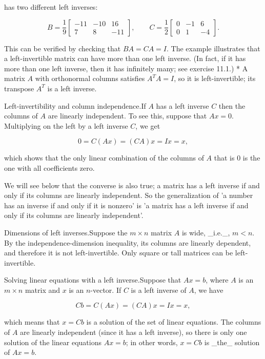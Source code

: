 has two different left inverses:

\[B=\frac{1}{9}\left[\begin{array}{rrr}-11&-10&16\\ 7&8&-11\end{array}\right],\qquad C=\frac{1}{2}\left[\begin{array}{rrr}0&-1&6\\ 0&1&-4\end{array}\right].\]

This can be verified by checking that \(BA=CA=I\). The example illustrates that a left-invertible matrix can have more than one left inverse. (In fact, if it has more than one left inverse, then it has infinitely many; see exercise 11.1.)
* A matrix \(A\) with orthonormal columns satisfies \(A^{T}A=I\), so it is left-invertible; its transpose \(A^{T}\) is a left inverse.

Left-invertibility and column independence.If \(A\) has a left inverse \(C\) then the columns of \(A\) are linearly independent. To see this, suppose that \(Ax=0\). Multiplying on the left by a left inverse \(C\), we get

\[0=C(Ax)=(CA)x=Ix=x,\]

which shows that the only linear combination of the columns of \(A\) that is \(0\) is the one with all coefficients zero.

We will see below that the converse is also true; a matrix has a left inverse if and only if its columns are linearly independent. So the generalization of 'a number has an inverse if and only if it is nonzero' is 'a matrix has a left inverse if and only if its columns are linearly independent'.

Dimensions of left inverses.Suppose the \(m\times n\) matrix \(A\) is wide, _i.e._, \(m<n\). By the independence-dimension inequality, its columns are linearly dependent, and therefore it is not left-invertible. Only square or tall matrices can be left-invertible.

Solving linear equations with a left inverse.Suppose that \(Ax=b\), where \(A\) is an \(m\times n\) matrix and \(x\) is an \(n\)-vector. If \(C\) is a left inverse of \(A\), we have

\[Cb=C(Ax)=(CA)x=Ix=x,\]

which means that \(x=Cb\) is a solution of the set of linear equations. The columns of \(A\) are linearly independent (since it has a left inverse), so there is only one solution of the linear equations \(Ax=b\); in other words, \(x=Cb\) is _the_ solution of \(Ax=b\).

